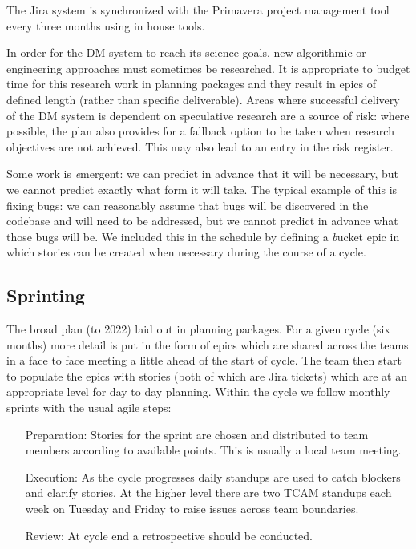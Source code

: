 The Jira system is synchronized with the Primavera project management tool every three months using in house tools.

In order for the DM system to reach its science goals, new algorithmic or engineering approaches must sometimes be researched.
It is appropriate to budget time for this research work in planning packages and they result in epics of defined length (rather than specific  deliverable).
Areas where successful delivery of the DM system is dependent on speculative research are a source of risk: where possible, the plan  also provides for a fallback option to be taken when research objectives are not achieved.
This may also lead to an entry in the risk register.


Some work is {\emph emergent}: we can predict in advance that it will be necessary, but we cannot
predict exactly what form it will take. The typical example of this is fixing bugs: we can reasonably
assume that bugs will be discovered in the codebase and will need to be addressed,
but we cannot predict in advance what those bugs will be.
We included this in the schedule by defining a {\emph bucket} epic in which stories can be created
when necessary during the course of a cycle.

\subsection{Sprinting} \label{sec:spront} \label{sec:jira_ticket}
The broad plan (to 2022)  laid out in planning packages.
For a  given  cycle (six months)   more detail is put in the form of epics which  are shared across the teams in a face to face meeting a little ahead of the start of cycle.  The team then start to populate the epics with stories (both of which are Jira tickets)  which are at an appropriate level for day to day planning.
Within the cycle we follow monthly sprints with the usual agile steps:
\begin{enumerate}
\item[Preparation:] Stories for the sprint are chosen and distributed to team members according to available points. This is usually a local team meeting.
\item[Execution:] As the cycle progresses daily standups are used to catch blockers and clarify stories. At the higher level there are two TCAM standups each week on Tuesday and Friday to raise issues across team boundaries.
\item[Review:] At cycle end a retrospective should be conducted.
\end{enumerate}

